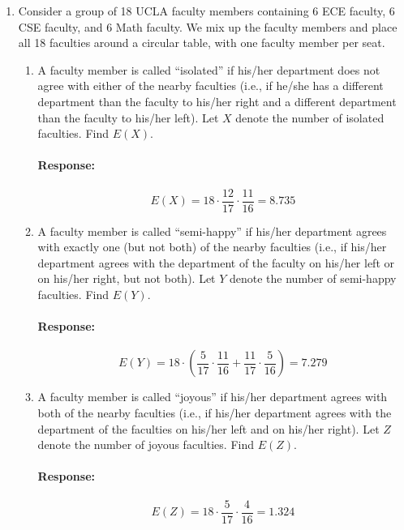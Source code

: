 \documentclass [11pt] {article}
\newenvironment{response}{\vspace{-10pt}\paragraph{Response:}}{}
\begin{document}
\begin{enumerate}
\begin{enumerate}
            \item Consider a group of 18 UCLA faculty members containing 6 ECE faculty,
                6 CSE faculty, and 6 Math faculty. We mix up the faculty members and place all 18
                faculties around a circular table, with one faculty member per seat.
                \begin{enumerate}[itemsep=10pt]
                    \item A faculty member is called ``isolated'' if his/her department does not
                        agree with either of the nearby faculties (i.e., if he/she has a different 
                        department than the faculty to his/her right and a different department 
                        than the faculty to his/her left). Let $X$ denote the number of isolated 
                        faculties. Find $E(X)$.
                        \begin{response}
                            \[E(X) = 18 \cdot \frac{12}{17} \cdot \frac{11}{16} = 8.735\] 
                        \end{response}
                    \item A faculty member is called ``semi-happy'' if his/her department agrees
                        with exactly one (but not both) of the nearby faculties (i.e., if his/her 
                        department agrees with the department of the faculty on his/her left or on 
                        his/her right, but not both). Let $Y$ denote the number of semi-happy 
                        faculties. Find $E(Y)$.
                        \begin{response}
                            \[E(Y) = 18 \cdot \left( \frac{5}{17} \cdot \frac{11}{16} + \frac{11}{17} \cdot \frac{5}{16}\right) = 7.279\]
                        \end{response}
                    \item A faculty member is called ``joyous'' if his/her department agrees with
                        both of the nearby faculties (i.e., if his/her department agrees with the 
                        department of the faculties on his/her left and on his/her right). Let $Z$ 
                        denote the number of joyous faculties. Find $E(Z)$.
                        \begin{response}
                            \[E(Z) = 18 \cdot \frac{5}{17} \cdot \frac{4}{16} = 1.324\]
                        \end{response}
                \end{enumerate}


\end{enumerate}
\end{enumerate}
\end{document}
